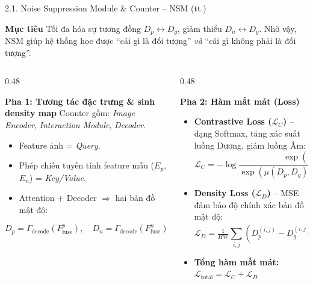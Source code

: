 \documentclass[11pt]{beamer}
\begin{document}
\begin{frame}[shrink=15]{2.1. Noise Suppression Module \& Counter -- NSM (tt.)}
\scriptsize

\begin{block}{\textbf{Mục tiêu}}
Tối đa hóa sự tương đồng $D_p \leftrightarrow D_g$, giảm thiểu $D_n \leftrightarrow D_g$. Nhờ vậy, NSM giúp hệ thống học được ``cái gì là đối tượng'' \emph{và} ``cái gì không phải là đối tượng''.
\end{block}

\vspace{0.3em}

\begin{columns}[T,onlytextwidth]
\begin{column}{0.48\textwidth}

\begin{block}{\textbf{Pha 1: Tương tác đặc trưng \& sinh density map}}
Counter gồm: \textit{Image Encoder}, \textit{Interaction Module}, \textit{Decoder}.
\begin{itemize}
  \item Feature ảnh = \textit{Query}.
  \item Phép chiếu tuyến tính feature mẫu ($E_p$, $E_n$) = \textit{Key/Value}.
  \item Attention + Decoder $\Rightarrow$ hai bản đồ mật độ:
\end{itemize}
\vspace{-0.3em}
\[
D_p = \Gamma_{\text{decode}}(F^p_{\text{fuse}}), \quad
D_n = \Gamma_{\text{decode}}(F^n_{\text{fuse}})
\]
\end{block}

\end{column}

\begin{column}{0.48\textwidth}

\begin{block}{\textbf{Pha 2: Hàm mất mát (Loss)}}
\begin{itemize}\setlength{\itemsep}{2pt}
  \item \textbf{Contrastive Loss ($\mathcal{L}_C$)} -- dạng Softmax, tăng xác suất luồng Dương, giảm luồng Âm:
  \vspace{-0.4em}
  \[
  \mathcal{L}_C = -\log \frac{\exp(\mu(D_p, D_g))}{\exp(\mu(D_p,D_g))+\exp(\mu(D_n,D_g))}
  \]
  \item \textbf{Density Loss ($\mathcal{L}_D$)} -- MSE đảm bảo độ chính xác bản đồ mật độ:
  \vspace{-0.4em}
  \[
  \mathcal{L}_D = \tfrac{1}{HW}\!\sum_{i,j}(D^{(i,j)}_p - D^{(i,j)}_g)^2
  \]
  \item \textbf{Tổng hàm mất mát:}
  $\mathcal{L}_{\text{total}} = \mathcal{L}_C + \mathcal{L}_D$
\end{itemize}
\end{block}


\end{column}
\end{columns}
\end{frame}
\end{document}
